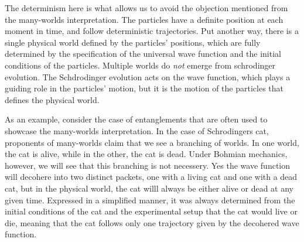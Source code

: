 \documentclass[11pt, a4paper]{article}
\begin{document}
The determinism here is what allows us to avoid the objection mentioned from the
many-worlds interpretation. The particles have a definite position at each
moment in time, and follow deterministic trajectories. Put another way, there is
a single physical world defined by the particles' positions, which are fully
determined by the specification of the universal wave function and the initial
conditions of the particles. Multiple worlds do \emph{not} emerge from 
schrodinger evolution. The Schdrodinger evolution acts on the wave function,
which plays a guiding role in the particles' motion, but it is the motion of the
particles that defines the physical world.

As an example, consider the case of entanglements that are often used to
showcase the many-worlds interpretation. In the case of Schrodingers cat, 
proponents of many-worlds claim that we see a branching of worlds. In one world,
the cat is alive, while in the other, the cat is dead. Under Bohmian mechanics,
however, we will see that this branching is not necessery. Yes the wave function
will decohere into two distinct packets, one with a living cat and one with a 
dead cat, but in the physical world, the cat willl always be either alive or
dead at any given time. Expressed in a simplified manner, it was always
determined from the initial conditions of the cat and the experimental setup
that the cat would live or die, meaning that the cat follows only one trajectory
given by the decohered wave function. 
\end{document}
